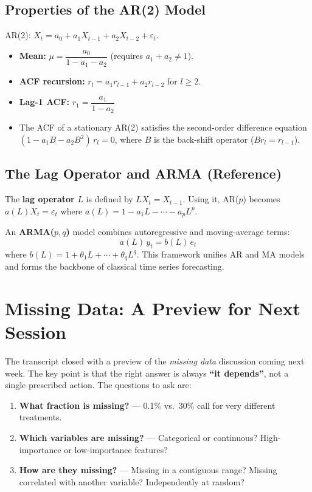\documentclass[11pt]{article}
\begin{document}
\subsection{Properties of the AR(2) Model}
AR(2): $X_t = a_0 + a_1 X_{t-1} + a_2 X_{t-2} + \varepsilon_t$.

\begin{itemize}
    \item \textbf{Mean:} $\mu = \dfrac{a_0}{1 - a_1 - a_2}$
      (requires $a_1 + a_2 \neq 1$).
    \item \textbf{ACF recursion:} $r_l = a_1 r_{l-1} + a_2 r_{l-2}$ for $l \geq 2$.
    \item \textbf{Lag-1 ACF:} $r_1 = \dfrac{a_1}{1 - a_2}$
    \item The ACF of a stationary AR(2) satisfies the second-order difference equation
      $(1 - a_1 B - a_2 B^2)\,r_l = 0$, where $B$ is the back-shift operator
      ($B r_l = r_{l-1}$).
\end{itemize}

\subsection{The Lag Operator and ARMA (Reference)}
The \textbf{lag operator} $L$ is defined by $L X_t = X_{t-1}$. Using it, AR($p$)
becomes $a(L) X_t = \varepsilon_t$ where $a(L) = 1 - a_1 L - \cdots - a_p L^p$.

An \textbf{ARMA($p,q$)} model combines autoregressive and moving-average terms:
\[
a(L)\,y_t = b(L)\,e_t
\]
where $b(L) = 1 + \theta_1 L + \cdots + \theta_q L^q$.
This framework unifies AR and MA models and forms the backbone of classical
time series forecasting.

\newpage
\section{Missing Data: A Preview for Next Session}

The transcript closed with a preview of the \emph{missing data} discussion coming
next week. The key point is that the right answer is always \textbf{``it depends''},
not a single prescribed action. The questions to ask are:

\begin{enumerate}
    \item \textbf{What fraction is missing?} --- 0.1\% vs.\ 30\% call for very
      different treatments.
    \item \textbf{Which variables are missing?} --- Categorical or continuous?
      High-importance or low-importance features?
    \item \textbf{How are they missing?} --- Missing in a contiguous range? Missing
      correlated with another variable? Independently at random?
\end{enumerate}
\end{document}
